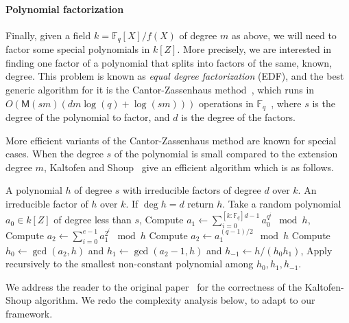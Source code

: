 \documentclass[12pt]{article}
\theoremstyle{plain}
\theoremstyle{definition}
\def\F{\ensuremath{\mathbb{F}}}
\def\MM{\ensuremath{\mathsf{M}}}
\newcounter{algorithm}
\begin{document}
\paragraph{Polynomial factorization}
Finally, given a field $k = \F_q[X]/f(X)$ of degree $m$ as above, we will need to
factor some special polynomials in $k[Z]$. More precisely, we are
interested in finding one factor of a polynomial that splits into
factors of the same, known, degree. This problem is known as
\emph{equal degree factorization} (EDF), and the best generic algorithm for
it is the Cantor-Zassenhaus method~\cite{cantor1981,von1992computing},
which runs in $O(\MM(sm)(dm\log(q) + \log(sm)))$ operations in
$\F_q$~\cite[Th.~14.9]{vzGG}, where $s$ is the degree of the
polynomial to factor, and $d$ is the degree of the factors.

More efficient variants of the Cantor-Zassenhaus method are known for
special cases. When the degree $s$ of the polynomial is small compared
to the extension degree $m$, Kaltofen and Shoup~\cite{kaltofen+shoup97} 
give an efficient algorithm which is as follows.

\begin{algorithm}
	\label{alg:ks}
	\begin{algorithmic}[1]
		\REQUIRE A polynomial $h$ of degree $s$ with irreducible factors of degree $d$ over $k$.
		\ENSURE An irreducible factor of $h$ over $k$.
		\STATE If $\deg h = d$ return $h$.
		\STATE Take a random polynomial $a_0\in k[Z]$ of degree less than $s$,
		\STATE\label{alg:ks-pseudotrace} Compute $\displaystyle a_1 
		\leftarrow \sum_{i=0}^{[k:\F_q]d-1} a_0^{q^i} \mod h$,
		\STATE\label{alg:ks:even} Compute $\displaystyle a_2 \leftarrow 
		\sum_{i=0}^{e-1} a_1^{2^i}\mod h$
		\ELSE
		\STATE\label{alg:ks:odd} Compute $a_2 \leftarrow a_1^{(q-1)/2}\mod h$
		\ENDIF
		\STATE\label{alg:ks:gcd} Compute $h_0\leftarrow\gcd(a_2,h)$ and 
		$h_1\leftarrow\gcd(a_2-1,h)$ and $h_{-1}\leftarrow h/(h_0h_1)$,
		\STATE Apply recursively to the smallest non-constant polynomial among 
		$h_0,h_1,h_{-1}$.
	\end{algorithmic}
\end{algorithm}

We address the reader to the original paper~\cite{kaltofen+shoup97}
for the correctness of the Kaltofen-Shoup algorithm. We redo the
complexity analysis below, to adapt to our framework.
\end{document}
